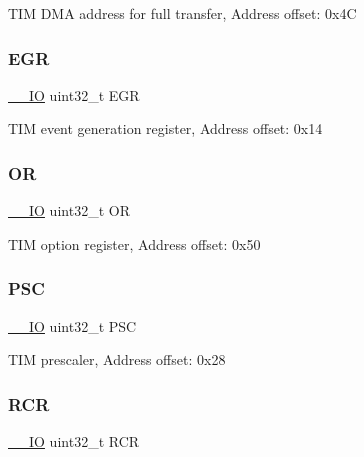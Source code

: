 T\+IM D\+MA address for full transfer, Address offset\+: 0x4C \mbox{\label{struct_t_i_m___type_def_a196ebdaac12b21e90320c6175da78ef6}} 
\subsubsection{\texorpdfstring{E\+GR}{EGR}}
{\footnotesize\ttfamily \mbox{\hyperlink{core__sc300_8h_aec43007d9998a0a0e01faede4133d6be}{\+\_\+\+\_\+\+IO}} uint32\+\_\+t E\+GR}

T\+IM event generation register, Address offset\+: 0x14 \mbox{\label{struct_t_i_m___type_def_a75ade4a9b3d40781fd80ce3e6589e98b}} 
\subsubsection{\texorpdfstring{OR}{OR}}
{\footnotesize\ttfamily \mbox{\hyperlink{core__sc300_8h_aec43007d9998a0a0e01faede4133d6be}{\+\_\+\+\_\+\+IO}} uint32\+\_\+t OR}

T\+IM option register, Address offset\+: 0x50 \mbox{\label{struct_t_i_m___type_def_a9d4c753f09cbffdbe5c55008f0e8b180}} 
\subsubsection{\texorpdfstring{P\+SC}{PSC}}
{\footnotesize\ttfamily \mbox{\hyperlink{core__sc300_8h_aec43007d9998a0a0e01faede4133d6be}{\+\_\+\+\_\+\+IO}} uint32\+\_\+t P\+SC}

T\+IM prescaler, Address offset\+: 0x28 \mbox{\label{struct_t_i_m___type_def_aa1b1b7107fcf35abe39d20f5dfc230ee}} 
\subsubsection{\texorpdfstring{R\+CR}{RCR}}
{\footnotesize\ttfamily \mbox{\hyperlink{core__sc300_8h_aec43007d9998a0a0e01faede4133d6be}{\+\_\+\+\_\+\+IO}} uint32\+\_\+t R\+CR}

